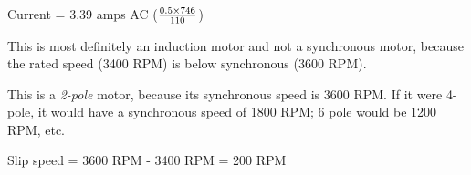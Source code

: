 Current = 3.39 amps AC ($0.5 \times 746 \over 110$)

\vskip 10pt

This is most definitely an induction motor and not a synchronous motor, because the rated speed (3400 RPM) is below synchronous (3600 RPM).
 
\vskip 10pt

This is a {\it 2-pole} motor, because its synchronous speed is 3600 RPM.  If it were 4-pole, it would have a synchronous speed of 1800 RPM; 6 pole would be 1200 RPM, etc.

\vskip 10pt

Slip speed = 3600 RPM - 3400 RPM = 200 RPM




